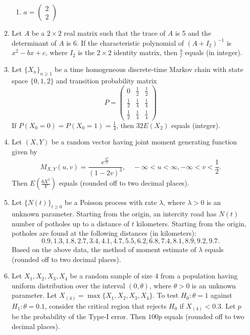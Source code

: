 \documentclass[journal,12pt,onecolumn]{IEEEtran}
\theoremstyle{remark}
\begin{document}
\begin{enumerate}
\begin{enumerate}
        \item $a = \begin{pmatrix}  2 \\ 2 \end{pmatrix}$
    \end{enumerate}
    \item Let $A$ be a $2 \times 2$ real matrix such that the trace of $A$ is 5 and the determinant of $A$ is 6. If the characteristic polynomial of $(A + I_2)^{-1}$ is $x^2 - bx + c$, where $I_2$ is the $2 \times 2$ identity matrix, then $\frac{b}{c}$ equals {\underline{\hspace{2cm}}} (in integer).
    \item Let $\{X_n\}_{n \geq 1}$ be a time homogeneous discrete-time Markov chain with state space $\{0, 1, 2\}$ and transition probability matrix
\[
    P = \begin{pmatrix}
        0 & \frac{1}{2} & \frac{1}{2} \\
        \frac{1}{2} & \frac{1}{4} & \frac{1}{4} \\
        \frac{1}{2} & \frac{1}{4} & \frac{1}{4}
    \end{pmatrix}
\]
    If $P(X_0 = 0) = P(X_0 = 1) = \frac{1}{4}$, then $32 E(X_2)$ equals  {\underline{\hspace{2cm}}}  (integer).
    \item Let $(X, Y)$ be a random vector having joint moment generating function given by
    $$M_{X,Y}(u, v) = \frac{e^{\frac{u^2}{2}}}{(1 - 2v)^3}, \quad -\infty < u < \infty, -\infty < v < \frac{1}{2}.$$
    Then $E(\frac{6X^2}{Y})$ equals {\underline{\hspace{2cm}}} (rounded off to two decimal places).

    \item Let $\{N(t)\}_{t \geq 0}$ be a Poisson process with rate $\lambda$, where $\lambda > 0$ is an unknown parameter. Starting from the origin, an intercity road has $N(t)$ number of potholes up to a distance of $t$ kilometers. Starting from the origin, potholes are found at the following distances (in kilometers):
\[
    0.9, 1.3, 1.8, 2.7, 3.4, 4.1, 4.7, 5.5, 6.2, 6.8, 7.4, 8.1, 8.9, 9.2, 9.7.
\]
    Based on the above data, the method of moment estimate of $\lambda$ equals  {\underline{\hspace{2cm}}} (rounded off to two decimal places).

    \item Let $X_1, X_2, X_3, X_4$ be a random sample of size 4 from a population having uniform distribution over the interval $(0, \theta)$, where $\theta > 0$ is an unknown parameter. Let $X_{(4)} = \max\{X_1, X_2, X_3, X_4\}$. To test $H_0: \theta = 1$ against $H_1: \theta = 0.1$, consider the critical region that rejects $H_0$ if $X_{(4)} < 0.3$. Let $p$ be the probability of the Type-I error. Then $100p$ equals  {\underline{\hspace{2cm}}} (rounded off to two decimal places).


\end{enumerate}
\end{document}
